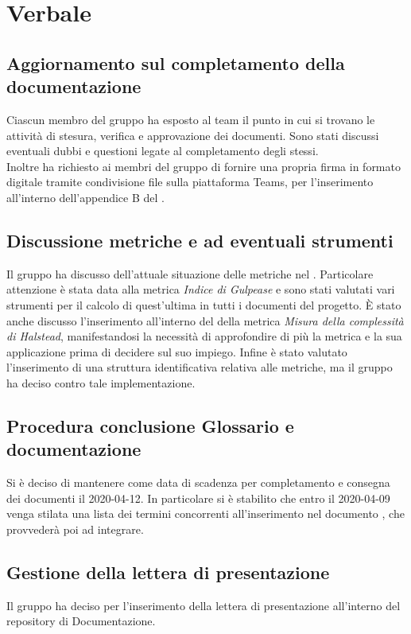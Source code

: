 \section{Verbale}

	\subsection{Aggiornamento sul completamento della documentazione}
	Ciascun membro del gruppo ha esposto al team il punto in cui si trovano le attività di stesura, verifica e approvazione dei documenti. Sono stati discussi eventuali dubbi e questioni legate al completamento degli stessi.\\ Inoltre \VB{} ha richiesto ai membri del gruppo di fornire una propria firma in formato digitale tramite condivisione file sulla piattaforma Teams, per l'inserimento all'interno dell'appendice B del \PdP{}.

	\subsection{Discussione metriche e ad eventuali strumenti}
	Il gruppo ha discusso dell'attuale situazione delle metriche nel \PdQ{}. Particolare attenzione è stata data alla metrica \textit{Indice di Gulpease} e sono stati valutati vari strumenti per il calcolo di quest'ultima in tutti i documenti del progetto. È stato anche discusso l'inserimento all'interno del \PdQ{} della metrica \textit{Misura della complessità di Halstead}, manifestandosi la necessità di approfondire di più la metrica e la sua applicazione prima di decidere sul suo impiego. Infine è stato valutato l'inserimento di una struttura identificativa relativa alle metriche, ma il gruppo ha deciso contro tale implementazione.

	\subsection{Procedura conclusione Glossario e documentazione}
	Si è deciso di mantenere come data di scadenza per completamento e consegna dei documenti il 2020-04-12. In particolare si è stabilito che entro il 2020-04-09 venga stilata una lista dei termini concorrenti all'inserimento nel documento \Glossario{}, che \AS{} provvederà poi ad integrare.

	\subsection{Gestione della lettera di presentazione}
	Il gruppo ha deciso per l'inserimento della lettera di presentazione all'interno del repository di Documentazione.

